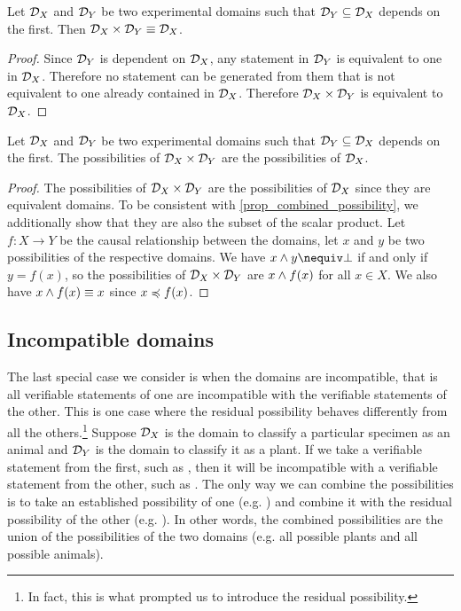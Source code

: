 \documentclass[11pt,letterpaper,fleqn]{memoir} %
\begin{document}
\begin{mathSection}
	\begin{prop}
		Let $\mathcal{D}_X$ and $\mathcal{D}_Y$ be two experimental domains such that $\mathcal{D}_Y \subseteq \mathcal{D}_X$ depends on the first. Then $\mathcal{D}_X \times \mathcal{D}_Y \equiv \mathcal{D}_X$.
	\end{prop}
	\begin{proof}
		Since $\mathcal{D}_Y$ is dependent on $\mathcal{D}_X$, any statement in $\mathcal{D}_Y$ is equivalent to one in $\mathcal{D}_X$. Therefore no statement can be generated from them that is not equivalent to one already contained in $\mathcal{D}_X$. Therefore $\mathcal{D}_X \times \mathcal{D}_Y$ is equivalent to $\mathcal{D}_X$. 
	\end{proof}
	\begin{coro}
		Let $\mathcal{D}_X$ and $\mathcal{D}_Y$ be two experimental domains such that $\mathcal{D}_Y \subseteq \mathcal{D}_X$ depends on the first. The possibilities of $\mathcal{D}_X \times \mathcal{D}_Y$ are the possibilities of $\mathcal{D}_X$.
	\end{coro}
	\begin{proof}
		The possibilities of $\mathcal{D}_X \times \mathcal{D}_Y$ are the possibilities of $\mathcal{D}_X$ since they are equivalent domains. To be consistent with \ref{prop_combined_possibility}, we additionally show that they are also the subset of the scalar product. Let $f : X \to Y$ be the causal relationship between the domains, let $x$ and $y$ be two possibilities of the respective domains. We have $x \AND y \nequiv \contradiction$ if and only if $y = f(x)$, so the possibilities of $\mathcal{D}_X \times \mathcal{D}_Y$ are $x \wedge f(x)$ for all $x \in X$. We also have $x \wedge f(x) \equiv x$ since $x \preccurlyeq f(x)$.
	\end{proof}
\end{mathSection}


\subsection{Incompatible domains}

The last special case we consider is when the domains are incompatible, that is all verifiable statements of one are incompatible with the verifiable statements of the other. This is one case where the residual possibility behaves differently from all the others.\footnote{In fact, this is what prompted us to introduce the residual possibility.} Suppose $\mathcal{D}_X$ is the domain to classify a particular specimen as an animal and $\mathcal{D}_Y$ is the domain to classify it as a plant. If we take a verifiable statement from the first, such as , then it will be incompatible with a verifiable statement from the other, such as . The only way we can combine the possibilities is to take an established possibility of one (e.g. ) and combine it with the residual possibility of the other (e.g. ). In other words, the combined possibilities are the union of the possibilities of the two domains (e.g. all possible plants and all possible animals).
\end{document}
